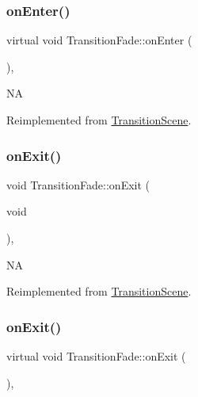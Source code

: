 \subsubsection{\texorpdfstring{on\+Enter()}{onEnter()}\hspace{0.1cm}{\footnotesize\ttfamily [2/2]}}
{\footnotesize\ttfamily virtual void Transition\+Fade\+::on\+Enter (\begin{DoxyParamCaption}{ }\end{DoxyParamCaption})\hspace{0.3cm}{\ttfamily [override]}, {\ttfamily [virtual]}}

NA 

Reimplemented from \hyperlink{classTransitionScene_aace390a1bd8f3c73bb650a1e256a0f83}{Transition\+Scene}.

\mbox{\label{classTransitionFade_aa476da6459ad94c3fb3254a261fe3161}} 
\subsubsection{\texorpdfstring{on\+Exit()}{onExit()}\hspace{0.1cm}{\footnotesize\ttfamily [1/2]}}
{\footnotesize\ttfamily void Transition\+Fade\+::on\+Exit (\begin{DoxyParamCaption}\item[{void}]{ }\end{DoxyParamCaption})\hspace{0.3cm}{\ttfamily [override]}, {\ttfamily [virtual]}}

NA 

Reimplemented from \hyperlink{classTransitionScene_a45e39b658189c79428a05c3bc3173bbb}{Transition\+Scene}.

\mbox{\label{classTransitionFade_a84179a9a978c9ff2e302e913f7d90cc4}} 
\subsubsection{\texorpdfstring{on\+Exit()}{onExit()}\hspace{0.1cm}{\footnotesize\ttfamily [2/2]}}
{\footnotesize\ttfamily virtual void Transition\+Fade\+::on\+Exit (\begin{DoxyParamCaption}{ }\end{DoxyParamCaption})\hspace{0.3cm}{\ttfamily [override]}, {\ttfamily [virtual]}}

